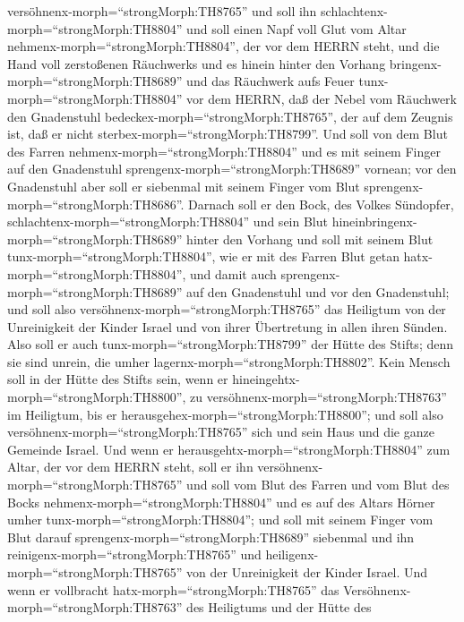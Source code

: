 versöhnenx-morph=``strongMorph:TH8765'' und soll ihn
schlachtenx-morph=``strongMorph:TH8804''  und soll einen
Napf voll Glut vom Altar nehmenx-morph=``strongMorph:TH8804'', der vor
dem HERRN steht, und die Hand voll zerstoßenen Räuchwerks und es hinein
hinter den Vorhang bringenx-morph=``strongMorph:TH8689'' 
und das Räuchwerk aufs Feuer tunx-morph=``strongMorph:TH8804'' vor dem
HERRN, daß der Nebel vom Räuchwerk den Gnadenstuhl
bedeckex-morph=``strongMorph:TH8765'', der auf dem Zeugnis ist, daß er
nicht sterbex-morph=``strongMorph:TH8799''.  Und soll von
dem Blut des Farren nehmenx-morph=``strongMorph:TH8804'' und es mit
seinem Finger auf den Gnadenstuhl sprengenx-morph=``strongMorph:TH8689''
vornean; vor den Gnadenstuhl aber soll er siebenmal mit seinem Finger
vom Blut sprengenx-morph=``strongMorph:TH8686''.  Darnach
soll er den Bock, des Volkes Sündopfer,
schlachtenx-morph=``strongMorph:TH8804'' und sein Blut
hineinbringenx-morph=``strongMorph:TH8689'' hinter den Vorhang und soll
mit seinem Blut tunx-morph=``strongMorph:TH8804'', wie er mit des Farren
Blut getan hatx-morph=``strongMorph:TH8804'', und damit auch
sprengenx-morph=``strongMorph:TH8689'' auf den Gnadenstuhl und vor den
Gnadenstuhl;  und soll also
versöhnenx-morph=``strongMorph:TH8765'' das Heiligtum von der
Unreinigkeit der Kinder Israel und von ihrer Übertretung in allen ihren
Sünden. Also soll er auch tunx-morph=``strongMorph:TH8799'' der Hütte
des Stifts; denn sie sind unrein, die umher
lagernx-morph=``strongMorph:TH8802''.  Kein Mensch soll in
der Hütte des Stifts sein, wenn er
hineingehtx-morph=``strongMorph:TH8800'', zu
versöhnenx-morph=``strongMorph:TH8763'' im Heiligtum, bis er
herausgehex-morph=``strongMorph:TH8800''; und soll also
versöhnenx-morph=``strongMorph:TH8765'' sich und sein Haus und die ganze
Gemeinde Israel.  Und wenn er
herausgehtx-morph=``strongMorph:TH8804'' zum Altar, der vor dem HERRN
steht, soll er ihn versöhnenx-morph=``strongMorph:TH8765'' und soll vom
Blut des Farren und vom Blut des Bocks
nehmenx-morph=``strongMorph:TH8804'' und es auf des Altars Hörner umher
tunx-morph=``strongMorph:TH8804'';  und soll mit seinem
Finger vom Blut darauf sprengenx-morph=``strongMorph:TH8689'' siebenmal
und ihn reinigenx-morph=``strongMorph:TH8765'' und
heiligenx-morph=``strongMorph:TH8765'' von der Unreinigkeit der Kinder
Israel.  Und wenn er vollbracht
hatx-morph=``strongMorph:TH8765'' das
Versöhnenx-morph=``strongMorph:TH8763'' des Heiligtums und der Hütte des
